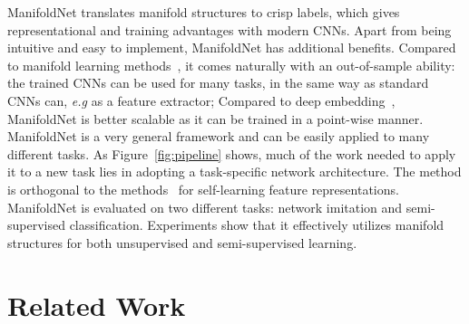 \documentclass{bmvc2k}
\def\eg{\emph{e.g}\bmvaOneDot}
\begin{document}
ManifoldNet translates manifold structures to crisp labels, which gives
representational and training advantages with modern CNNs. Apart from
being intuitive and easy to implement, ManifoldNet has additional
benefits. Compared to manifold learning methods~\cite{lle:science:00,dai:metric:imitation,isomap},  it comes naturally with an out-of-sample ability: the trained CNNs 
can be used for many tasks, in the same way as standard CNNs can, \eg 
as a feature extractor; 
Compared to deep embedding~\cite{Weston:2008,deep:kernel:reg:09, manifold:cnn:14, revisiting:semi_graph}, ManifoldNet is better scalable as it can be trained in a point-wise manner.  
ManifoldNet is a very general framework and can be easily applied to many different tasks.
As Figure~\ref{fig:pipeline} shows, much of the work needed to apply 
it to a new task lies in adopting a task-specific network 
architecture. The method is orthogonal to the  methods~\cite{doersch2015unsupervised,fl:video,DFB16} for self-learning feature representations.  
ManifoldNet is evaluated on two different tasks: network imitation and semi-supervised
classification. Experiments show that it effectively utilizes manifold structures for both unsupervised and semi-supervised learning. 



\section{Related Work}
\label{sec:related}

\end{document}
